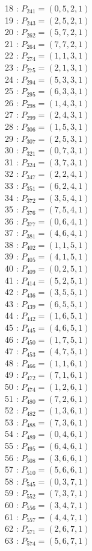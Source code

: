 \documentclass{article}
\begin{document}
{\begin{multicols}{2}
18 : $P_{241}=( 0, 5, 2, 1 )$\\
19 : $P_{243}=( 2, 5, 2, 1 )$\\
20 : $P_{262}=( 5, 7, 2, 1 )$\\
21 : $P_{264}=( 7, 7, 2, 1 )$\\
22 : $P_{274}=( 1, 1, 3, 1 )$\\
23 : $P_{275}=( 2, 1, 3, 1 )$\\
24 : $P_{294}=( 5, 3, 3, 1 )$\\
25 : $P_{295}=( 6, 3, 3, 1 )$\\
26 : $P_{298}=( 1, 4, 3, 1 )$\\
27 : $P_{299}=( 2, 4, 3, 1 )$\\
28 : $P_{306}=( 1, 5, 3, 1 )$\\
29 : $P_{307}=( 2, 5, 3, 1 )$\\
30 : $P_{321}=( 0, 7, 3, 1 )$\\
31 : $P_{324}=( 3, 7, 3, 1 )$\\
32 : $P_{347}=( 2, 2, 4, 1 )$\\
33 : $P_{351}=( 6, 2, 4, 1 )$\\
34 : $P_{372}=( 3, 5, 4, 1 )$\\
35 : $P_{376}=( 7, 5, 4, 1 )$\\
36 : $P_{377}=( 0, 6, 4, 1 )$\\
37 : $P_{381}=( 4, 6, 4, 1 )$\\
38 : $P_{402}=( 1, 1, 5, 1 )$\\
39 : $P_{405}=( 4, 1, 5, 1 )$\\
40 : $P_{409}=( 0, 2, 5, 1 )$\\
41 : $P_{414}=( 5, 2, 5, 1 )$\\
42 : $P_{436}=( 3, 5, 5, 1 )$\\
43 : $P_{439}=( 6, 5, 5, 1 )$\\
44 : $P_{442}=( 1, 6, 5, 1 )$\\
45 : $P_{445}=( 4, 6, 5, 1 )$\\
46 : $P_{450}=( 1, 7, 5, 1 )$\\
47 : $P_{453}=( 4, 7, 5, 1 )$\\
48 : $P_{466}=( 1, 1, 6, 1 )$\\
49 : $P_{472}=( 7, 1, 6, 1 )$\\
50 : $P_{474}=( 1, 2, 6, 1 )$\\
51 : $P_{480}=( 7, 2, 6, 1 )$\\
52 : $P_{482}=( 1, 3, 6, 1 )$\\
53 : $P_{488}=( 7, 3, 6, 1 )$\\
54 : $P_{489}=( 0, 4, 6, 1 )$\\
55 : $P_{495}=( 6, 4, 6, 1 )$\\
56 : $P_{508}=( 3, 6, 6, 1 )$\\
57 : $P_{510}=( 5, 6, 6, 1 )$\\
58 : $P_{545}=( 0, 3, 7, 1 )$\\
59 : $P_{552}=( 7, 3, 7, 1 )$\\
60 : $P_{556}=( 3, 4, 7, 1 )$\\
61 : $P_{557}=( 4, 4, 7, 1 )$\\
62 : $P_{571}=( 2, 6, 7, 1 )$\\
63 : $P_{574}=( 5, 6, 7, 1 )$\\
\end{multicols}
}
\end{document}
